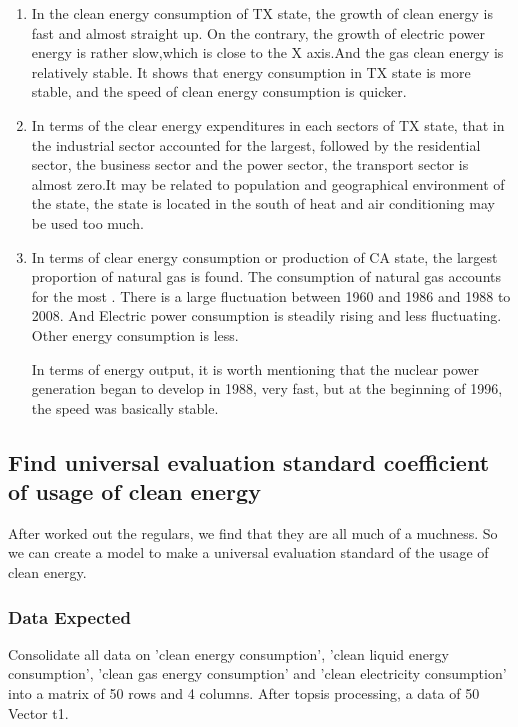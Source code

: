 \documentclass[a4paper]{article}
\begin{document}
\begin{enumerate}
\item In the clean energy consumption of TX state, the growth of clean energy is fast and almost straight up. On the contrary, the growth of electric power energy is rather slow,which is close to the X axis.And the gas clean energy  is relatively stable. It shows that energy consumption in TX state is more stable, and the speed of clean energy consumption is quicker.

\item In terms of the clear energy expenditures in each sectors of TX state, that in the industrial sector accounted for the largest, followed by the residential sector, the business sector and the power sector, the transport sector is almost zero.It may be related to population and geographical environment of the state, the state is located in the south of heat and air conditioning may  be used too much.

\item In terms of clear energy consumption or production of CA state, the largest proportion of natural gas is found. The consumption of natural gas accounts for the most . There is a large fluctuation between 1960 and 1986 and 1988 to 2008. And Electric power consumption is steadily rising and less fluctuating. Other energy consumption is less.

In terms of energy output, it is worth mentioning that the nuclear power generation began to develop in 1988, very fast, but at the beginning of 1996, the speed was basically stable.

\end{enumerate}

\subsection{Find universal evaluation standard coefficient of usage of clean energy}

After worked out the regulars, we find that they are all much of a muchness. So we can create a model to make a universal evaluation standard of the usage of clean energy.

\subsubsection{Data Expected}

Consolidate all data on 'clean energy consumption', 'clean liquid energy consumption', 'clean gas energy consumption' and 'clean electricity consumption' into a matrix of 50 rows and 4 columns. After topsis processing, a data of 50 Vector t1.
\end{document}
